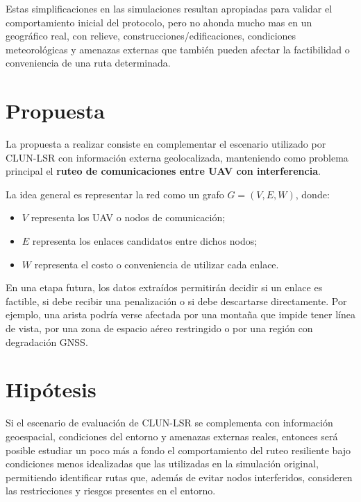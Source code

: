 \documentclass[journal,10pt]{IEEEtran}
\begin{document}
Estas simplificaciones en las simulaciones resultan apropiadas para validar el comportamiento inicial del protocolo,
pero no ahonda mucho mas en un 
geográfico real, con relieve, construcciones/edificaciones, condiciones meteorológicas y amenazas externas que
también pueden afectar la factibilidad o conveniencia de una ruta determinada.

\section{Propuesta}

La propuesta a realizar consiste en complementar el escenario utilizado por CLUN-LSR con
información externa geolocalizada, manteniendo como problema principal el \textbf{ruteo de
comunicaciones entre UAV con interferencia}.

La idea general es representar la red como un grafo $G=(V,E,W)$, donde:

\begin{itemize}
    \item $V$ representa los UAV o nodos de comunicación;
    \item $E$ representa los enlaces candidatos entre dichos nodos;
    \item $W$ representa el costo o conveniencia de utilizar cada enlace.
\end{itemize}

En una etapa futura, los datos extraídos permitirán decidir si un enlace es factible, si debe
recibir una penalización o si debe descartarse directamente. Por ejemplo, una arista podría verse
afectada por una montaña que impide tener línea de vista, por una zona de espacio aéreo restringido o
por una región con degradación GNSS.

\section{Hipótesis}

Si el escenario de evaluación de CLUN-LSR se complementa con información geoespacial, condiciones del entorno y amenazas externas reales, entonces será posible estudiar un poco más a fondo el
comportamiento del ruteo resiliente bajo condiciones menos idealizadas que las utilizadas en la
simulación original, permitiendo identificar rutas que, además de evitar nodos interferidos,
consideren las restricciones y riesgos presentes en el entorno.
\end{document}
